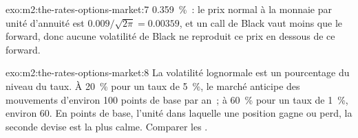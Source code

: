 \begin{solution}{exo:m2:the-rates-options-market:7}
0.359~\%~: le prix normal à la monnaie par unité d'annuité est
$0.009/\sqrt{2\pi} = 0.00359$, et un call de Black vaut moins que le forward,
donc aucune volatilité de Black ne reproduit ce prix en dessous de ce forward.
\end{solution}

\begin{solution}{exo:m2:the-rates-options-market:8}
La volatilité lognormale est un pourcentage du niveau du taux. À 20~\% pour un taux de 5~\%,
le marché anticipe des mouvements d'environ 100 points de base par an~; à 60~\% pour un taux de 1~\%,
environ 60. En points de base, l'unité dans laquelle une position gagne ou perd, la
seconde devise est la plus calme. Comparer les .
\end{solution}

